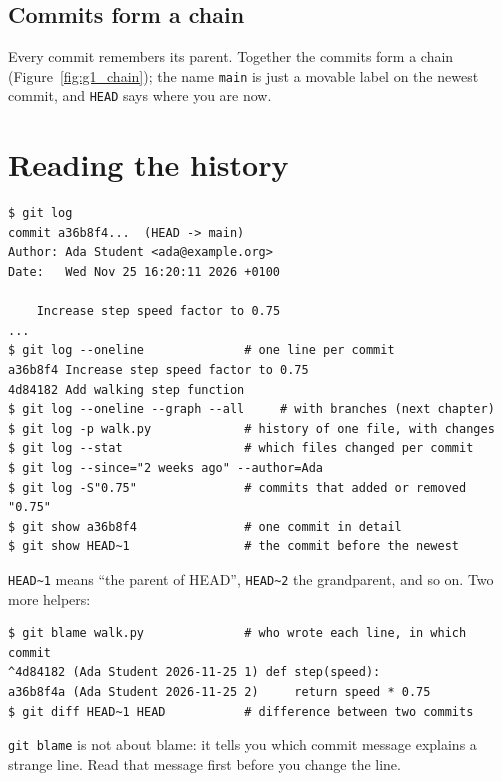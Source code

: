 \subsection*{Commits form a chain}
Every commit remembers its parent. Together the commits form a chain (Figure~\ref{fig:g1_chain}); the name \texttt{main} is just a movable label on the newest commit, and \texttt{HEAD} says where you are now.
\begin{center}
\label{fig:g1_chain}
\end{center}

\section*{Reading the history}
\begin{verbatim}
$ git log
commit a36b8f4...  (HEAD -> main)
Author: Ada Student <ada@example.org>
Date:   Wed Nov 25 16:20:11 2026 +0100

    Increase step speed factor to 0.75
...
$ git log --oneline              # one line per commit
a36b8f4 Increase step speed factor to 0.75
4d84182 Add walking step function
$ git log --oneline --graph --all     # with branches (next chapter)
$ git log -p walk.py             # history of one file, with changes
$ git log --stat                 # which files changed per commit
$ git log --since="2 weeks ago" --author=Ada
$ git log -S"0.75"               # commits that added or removed "0.75"
$ git show a36b8f4               # one commit in detail
$ git show HEAD~1                # the commit before the newest
\end{verbatim}
\verb!HEAD~1! means ``the parent of HEAD'', \verb!HEAD~2! the grandparent, and so on. Two more helpers:
\begin{verbatim}
$ git blame walk.py              # who wrote each line, in which commit
^4d84182 (Ada Student 2026-11-25 1) def step(speed):
a36b8f4a (Ada Student 2026-11-25 2)     return speed * 0.75
$ git diff HEAD~1 HEAD           # difference between two commits
\end{verbatim}
\texttt{git blame} is not about blame: it tells you which commit message explains a strange line. Read that message first before you change the line.

